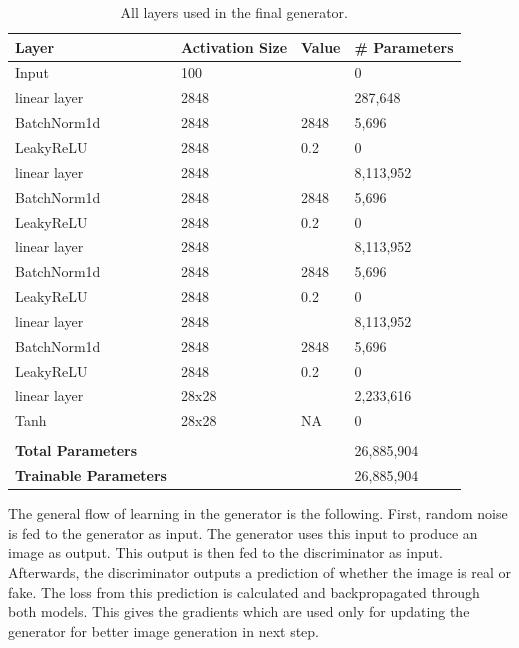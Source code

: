 \documentclass[12pt, fleqn, titlepage]{article}
\begin{document}
\begin{table}[H]
	\centering
	\begin{tabular}{llll}\toprule
		Layer                        & Activation Size & Value & \# Parameters\\ \midrule
		Input                        & 100             &       & 0            \\
		linear layer                 & 2848            &       & 287,648      \\
		BatchNorm1d                  & 2848            & 2848  & 5,696        \\
		LeakyReLU                    & 2848            & 0.2   & 0            \\
		linear layer                 & 2848            &       & 8,113,952    \\
		BatchNorm1d                  & 2848            & 2848  & 5,696        \\
		LeakyReLU                    & 2848            & 0.2   & 0            \\
		linear layer                 & 2848            &       & 8,113,952    \\
		BatchNorm1d                  & 2848            & 2848  & 5,696        \\
		LeakyReLU                    & 2848            & 0.2   & 0            \\
		linear layer                 & 2848            &       & 8,113,952    \\
		BatchNorm1d                  & 2848            & 2848  & 5,696        \\
		LeakyReLU                    & 2848            & 0.2   & 0            \\
		linear layer                 & 28x28           &       & 2,233,616    \\
		Tanh                         & 28x28           & NA    & 0            \\
		                             &                 &       &              \\
		\textbf{Total Parameters}    &                 &       & 26,885,904   \\
		\textbf{Trainable Parameters}&                 &       & 26,885,904   \\  \bottomrule
	\end{tabular}
	\caption{All layers used in the final generator.}
	\label{tab:gan_generator}
\end{table}

The general flow of learning in the generator is the following. First, random noise is fed to the generator as input. The generator uses this input to produce an image as output. This output is then fed to the discriminator as input. Afterwards, the discriminator outputs a prediction of whether the image is real or fake. The loss from this prediction is calculated and backpropagated through both models. This gives the gradients which are used only for updating the generator for better image generation in next step. \cite{developers.google_generator}
\end{document}
